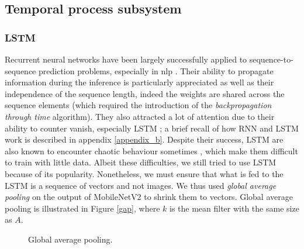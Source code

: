 \documentclass[12pt, a4paper]{report}
\begin{document}
			\subsection{Temporal process subsystem}\label{subsystems}
				\subsubsection{LSTM}\label{lstm}
					Recurrent neural networks have been largely successfully applied to sequence-to-sequence prediction problems, especially in \gls{nlp} \cite{wu2016google,shen2018natural,miao2020application}.
					Their ability to propagate information during the inference is particularly appreciated as well as their independence of the sequence length, indeed the weights are shared across the sequence elements (which required the introduction of the {\itshape backpropagation through time} algorithm).
					They also attracted a lot of attention due to their ability to counter \gls{vanish}, especially LSTM \cite{Hochreiter1997lstm}; a brief recall of how RNN and LSTM work is described in appendix \ref{appendix_b}.
					Despite their success, LSTM are also known to encounter chaotic behaviour sometimes \cite{bertschinger2004,laurent2016recurrent}, which make them difficult to train with little data.
					Albeit these difficulties, we still tried to use LSTM because of its popularity.
					Nonetheless, we must ensure that what is fed to the LSTM is a sequence of vectors and not images.
					We thus used {\itshape global average pooling} on the output of MobileNetV2 to shrink them to vectors.
					Global average pooling is illustrated in Figure \ref{gap}, where $k$ is the mean filter with the same size as $A$.
					\begin{figure}[h!]
						\centering
						\caption{Global average pooling.}
					\end{figure}
\end{document}
